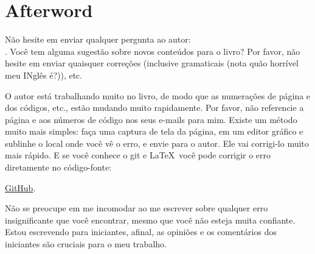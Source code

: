 \part*{Afterword}


Não hesite em enviar qualquer pergunta ao autor: \\
\GTT{<\EMAIL>}.
Você tem alguma sugestão sobre novos conteúdos para o livro?
Por favor, não hesite em enviar quaisquer correções (inclusive gramaticais (nota quão horrível meu INglês é?)), etc.

O autor está trabalhando muito no livro, de modo que as numerações de página e dos códigos, etc., estão mudando muito rapidamente.
Por favor, não referencie a página e aos números de código nos seus e-mails para mim.
Existe um método muito mais simples: faça uma captura de tela da página, em um editor gráfico e sublinhe o local onde você vê o erro, e envie para o autor. Ele vai corrigi-lo muito mais rápido.
E se você conhece o git e \LaTeX\, você pode corrigir o erro diretamente no código-fonte:

\href{http://go.yurichev.com/17089}{GitHub}.

Não se preocupe em me incomodar ao me escrever sobre qualquer erro insignificante que você encontrar, mesmo que você não esteja muita confiante. Estou escrevendo para iniciantes, afinal, as opiniões e os comentários dos iniciantes são cruciais para o meu trabalho.
